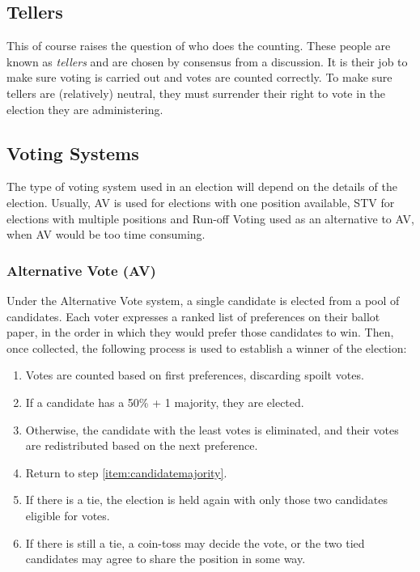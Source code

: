 \documentclass[a4paper, 12pt]{article} %
\begin{document}
\subsection{Tellers}
This of course raises the question of who does the counting.  These people are known as \emph{tellers} and are chosen by consensus from a discussion.  It is their job to make sure voting is carried out and votes are counted correctly.  To make sure tellers are (relatively) neutral, they must surrender their right to vote in the election they are administering.

\subsection{Voting Systems}
The type of voting system used in an election will depend on the details of the election.  Usually, AV is used for elections with one position available, STV for elections with multiple positions and Run-off Voting used as an alternative to AV, when AV would be too time consuming.

\subsubsection{Alternative Vote (AV)}
\label{sec:av}
Under the Alternative Vote system, a single candidate is elected from a pool of candidates.  Each voter expresses a ranked list of preferences on their ballot paper, in the order in which they would prefer those candidates to win.  Then, once collected, the following process is used to establish a winner of the election:

\begin{enumerate}
\item Votes are counted based on first preferences, discarding spoilt votes.
\item \label{item:candidatemajority} If a candidate has a 50\% + 1 majority, they are elected.
\item Otherwise, the candidate with the least votes is eliminated, and their votes are redistributed based on the next preference.
\item Return to step \ref{item:candidatemajority}.
\item If there is a tie, the election is held again with only those two candidates eligible for votes.
\item If there is still a tie, a coin-toss may decide the vote, or the two tied candidates may agree to share the position in some way.
\end{enumerate}
\end{document}
